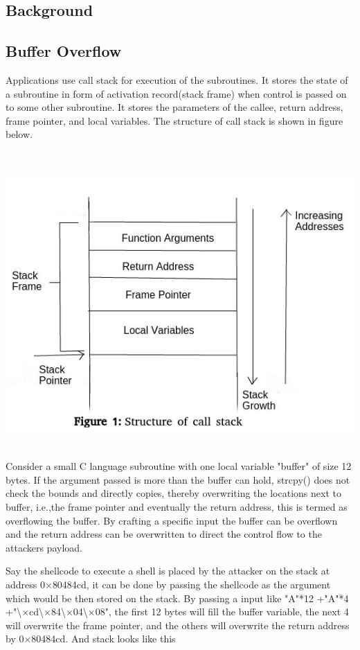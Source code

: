 \documentclass{article}
\begin{document}
\begin{multicols}{2}
	\section{Background}
	
	\subsection{Buffer Overflow}
	Applications use call stack for execution of the subroutines. It stores the state of a subroutine in form of activation record(stack frame) when control is passed on to some other subroutine. It stores the parameters of the callee, return address, frame pointer, and local variables. The structure of call stack is shown in figure below.
	
	\
	\
	
	\includegraphics[scale=.4]{stack_normal.jpg}
	\
	\
	\
	
	Consider a small C language subroutine with one local variable "buffer" of size 12 bytes. If the argument passed is more than the buffer can hold, strcpy() does not check the bounds and directly copies, thereby overwriting the locations next to buffer, i.e.,the frame pointer and eventually the return address, this is termed as overflowing the buffer. By crafting a specific input the buffer can be overflown and the return address can be overwritten to direct the control flow to the attackers payload. 
	
	Say the shellcode to execute a shell is placed by the attacker on the stack at address 0$\times$80484cd, it can be done by passing the shellcode as the argument which would be then stored on the stack. By passing a input like "A"*12 +"A"*4 +"\textbackslash $\times$cd\textbackslash $\times$84\textbackslash $\times$04\textbackslash $\times$08", the first 12 bytes will fill the buffer variable, the next 4 will overwrite the frame pointer, and the others will overwrite the return address by 0$\times$80484cd. And stack looks like this
	

\end{multicols}
\end{document}
